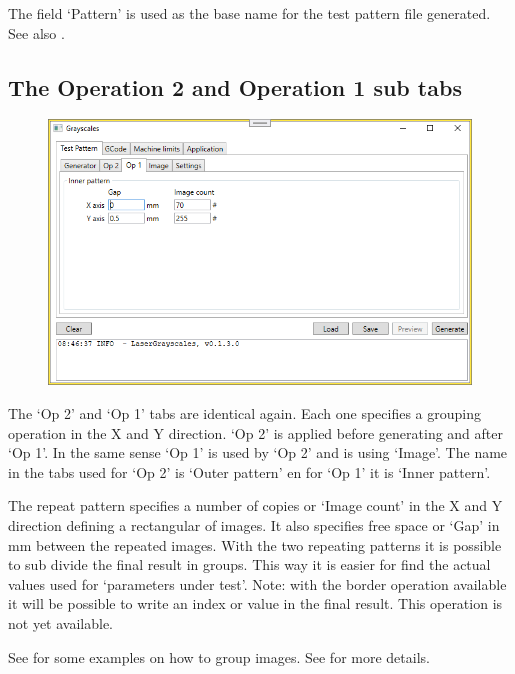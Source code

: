 The field `Pattern' is used as the base name for the test pattern file generated. See also .

\subsection{The Operation 2 and Operation 1 sub tabs}\label{TestPatternOpTab}
\begin{figure}[h!]
    \centering
    \includegraphics[width=0.8\linewidth]{./images/Operation1.png}
\end{figure}

The `Op 2' and `Op 1' tabs are identical again. Each one specifies a grouping operation in the X and Y direction. `Op 2' is applied before generating and after `Op 1'.
In the same sense `Op 1' is used by `Op 2' and is using `Image'. The name in the tabs used for `Op 2'  is `Outer pattern' en for `Op 1' it is `Inner pattern'.

The repeat pattern specifies a number of copies or `Image count' in the X and Y direction defining a rectangular of images. It also specifies free space or `Gap' in mm
between the repeated images. With the two repeating patterns it is possible to sub divide the final result in groups. This way it is easier for find the actual values
used for `parameters under test'. Note: with the border operation available it will be possible to write an index or value in the final result. This operation is
not yet available.

See  for some examples on how to group images. See  for more details.

